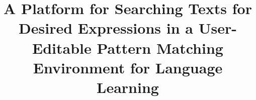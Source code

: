 \documentclass[conference]{IEEEtran}
\begin{document}
\title{A Platform for Searching Texts for Desired Expressions in a User-Editable Pattern Matching Environment for Language Learning\\
}

\author{
\and
{}
}

\maketitle
\end{document}
